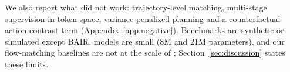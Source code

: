 We also report what did not work: trajectory-level matching, multi-stage supervision in token space, variance-penalized planning and a counterfactual action-contrast term (Appendix~\ref{app:negative}). Benchmarks are synthetic or simulated except BAIR, models are small (8M and 21M parameters), and our flow-matching baselines are not at the scale of \citet{porcher2026flowwm}; Section~\ref{sec:discussion} states these limits.
